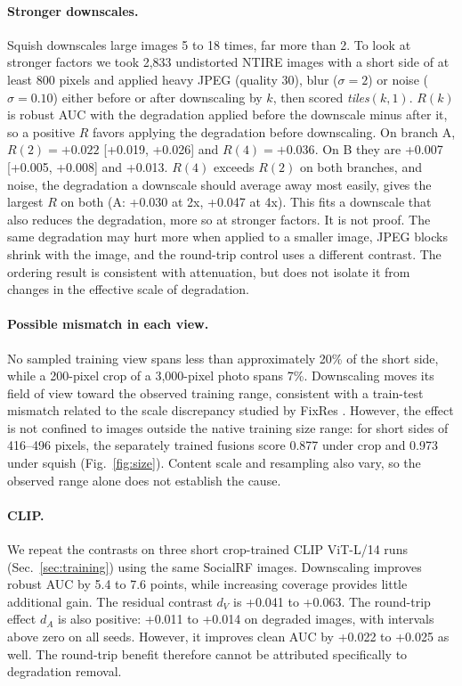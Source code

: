 \documentclass[letterpaper]{article} %
\begin{document}
\paragraph{Stronger downscales.} Squish downscales large images 5 to 18
times, far more than 2. To look at stronger factors we took 2,833 undistorted
NTIRE images with a short side of at least 800 pixels and applied heavy JPEG
(quality 30), blur ($\sigma = 2$) or noise ($\sigma = 0.10$) either before or
after downscaling by $k$, then scored \emph{tiles}$(k, 1)$. $R(k)$ is robust
AUC with the degradation applied before the downscale minus after it, so a
positive $R$ favors applying the degradation before downscaling. On branch A,
$R(2) = +0.022$ [+0.019, +0.026] and $R(4) = +0.036$. On B they are +0.007
[+0.005, +0.008] and +0.013. $R(4)$ exceeds $R(2)$ on both branches, and noise,
the degradation a downscale should average away most easily, gives the largest
$R$ on both (A: +0.030 at 2x, +0.047 at 4x). This fits a downscale that also
reduces the degradation, more so at stronger factors. It is not proof. The
same degradation may hurt more when applied to a smaller image, JPEG blocks
shrink with the image, and the round-trip control uses a different
contrast. The ordering result is consistent with attenuation, but does
not isolate it from changes in the effective scale of degradation.

\paragraph{Possible mismatch in each view.} No sampled training view spans
less than approximately 20\% of the short side, while a 200-pixel crop of a
3,000-pixel photo spans 7\%. Downscaling moves its field of view toward the
observed training range, consistent with a train-test mismatch related to
the scale discrepancy studied by FixRes \cite{touvron2019fixres}.
However, the effect is not confined to images outside the native training
size range: for short sides of 416--496 pixels, the separately trained
fusions score 0.877 under crop and 0.973 under squish
(Fig.~\ref{fig:size}). Content scale and resampling also vary, so the
observed range alone does not establish the cause.

\paragraph{CLIP.} We repeat the contrasts on three short crop-trained CLIP
ViT-L/14 runs (Sec.~\ref{sec:training}) using the same SocialRF images.
Downscaling improves robust AUC by 5.4 to 7.6 points, while increasing
coverage provides little additional gain. The residual contrast $d_V$
is +0.041 to +0.063. The round-trip effect $d_A$ is also positive:
+0.011 to +0.014 on degraded images, with intervals above zero on all
seeds. However, it improves clean AUC by +0.022 to +0.025 as well.
The round-trip benefit therefore cannot be attributed specifically to
degradation removal.
\end{document}
